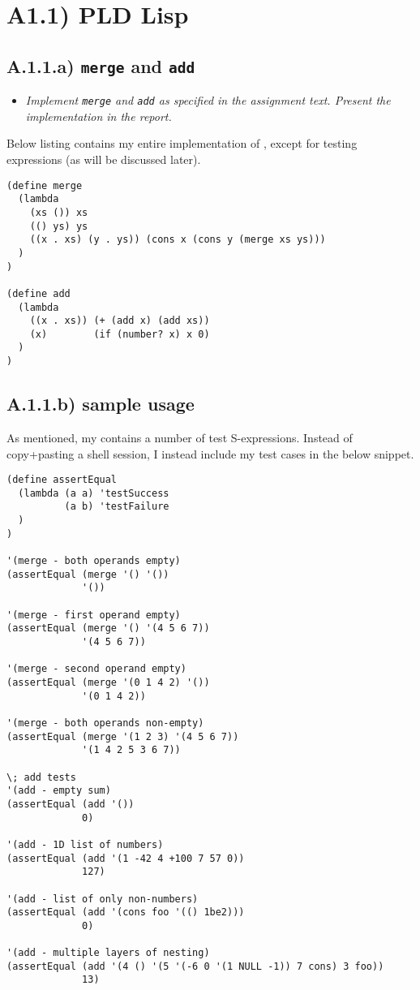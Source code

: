\section{A1.1) PLD Lisp}

\subsection{A.1.1.a) \texttt{merge} and \texttt{add}}
\label{merge_add}

\begin{itemize}
    \item \emph{Implement \texttt{merge} and \texttt{add} as specified in the
        assignment text. Present the implementation in the report.}
\end{itemize}

Below listing contains my entire implementation of , except
for testing expressions (as will be discussed later).

\begin{verbatim}
(define merge
  (lambda
    (xs ()) xs
    (() ys) ys
    ((x . xs) (y . ys)) (cons x (cons y (merge xs ys)))
  )
)

(define add
  (lambda
    ((x . xs)) (+ (add x) (add xs))
    (x)        (if (number? x) x 0)
  )
)
\end{verbatim}

\sectend

\newpage
\subsection{A.1.1.b) sample usage}

As mentioned, my  contains a number of test S-expressions.
Instead of copy+pasting a shell session, I instead include my test cases in the
below snippet.

\begin{verbatim}
(define assertEqual
  (lambda (a a) 'testSuccess
          (a b) 'testFailure
  )
)

'(merge - both operands empty)
(assertEqual (merge '() '())
             '())

'(merge - first operand empty)
(assertEqual (merge '() '(4 5 6 7))
             '(4 5 6 7))

'(merge - second operand empty)
(assertEqual (merge '(0 1 4 2) '())
             '(0 1 4 2))

'(merge - both operands non-empty)
(assertEqual (merge '(1 2 3) '(4 5 6 7))
             '(1 4 2 5 3 6 7))

\; add tests
'(add - empty sum)
(assertEqual (add '())
             0)

'(add - 1D list of numbers)
(assertEqual (add '(1 -42 4 +100 7 57 0))
             127)

'(add - list of only non-numbers)
(assertEqual (add '(cons foo '(() 1be2)))
             0)

'(add - multiple layers of nesting)
(assertEqual (add '(4 () '(5 '(-6 0 '(1 NULL -1)) 7 cons) 3 foo))
             13)
\end{verbatim}

